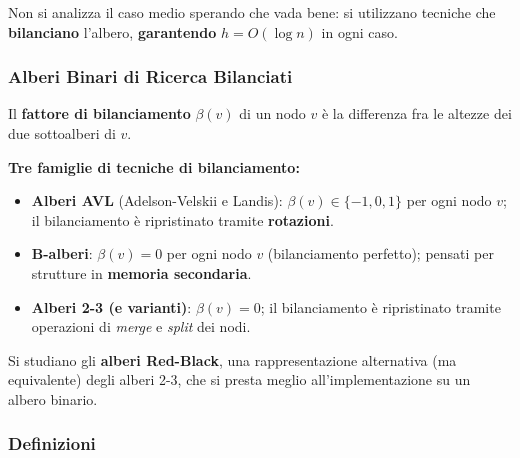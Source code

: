 \documentclass[12pt, a4paper]{article}
\begin{document}
\begin{tcolorbox}[colback=lightergray!5, colframe=tocsubsec, title=\textbf{Nella Realtà}]
Non si analizza il caso medio sperando che vada bene: si utilizzano tecniche che \textbf{bilanciano} l'albero, \textbf{garantendo} $h=O(\log n)$ in ogni caso.
\end{tcolorbox}

\subsubsection{Alberi Binari di Ricerca Bilanciati}

\begin{tcolorbox}[colback=lightergray!10, colframe=tocsec, title=\textbf{Definizione: Fattore di Bilanciamento}]
\label{def:fattore-bilanciamento}
Il \textbf{fattore di bilanciamento} $\beta(v)$ di un nodo $v$ è la differenza fra le altezze dei due sottoalberi di $v$.
\end{tcolorbox}

\textbf{Tre famiglie di tecniche di bilanciamento:}
\begin{itemize}
    \item \textbf{Alberi AVL} (Adelson-Velskii e Landis): $\beta(v)\in\{-1,0,1\}$ per ogni nodo $v$; il bilanciamento è ripristinato tramite \textbf{rotazioni}.
    \item \textbf{B-alberi}: $\beta(v)=0$ per ogni nodo $v$ (bilanciamento perfetto); pensati per strutture in \textbf{memoria secondaria}.
    \item \textbf{Alberi 2-3 (e varianti)}: $\beta(v)=0$; il bilanciamento è ripristinato tramite operazioni di \textit{merge} e \textit{split} dei nodi.
\end{itemize}

\begin{tcolorbox}[colback=lightergray!5, colframe=tocsubsec, title=\textbf{In Questo Corso}]
Si studiano gli \textbf{alberi Red-Black}, una rappresentazione alternativa (ma equivalente) degli alberi 2-3, che si presta meglio all'implementazione su un albero binario.
\end{tcolorbox}

\subsubsection{Definizioni}
\end{document}
